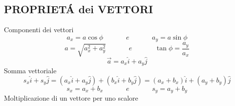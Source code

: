 \documentclass{article}
\newcommand\mathspace{\;\;\;\;\;\;\;\;\;\;\;\; e \;\;\;\;\;\;\;\;\;\;\;\;}
\begin{document}
		\begin{multicols}{2}

		\subsection{PROPRIET\'A dei VETTORI}
			Componenti dei vettori
			\begin{equation} a_x = a \cos \phi \mathspace a_y = a \sin \phi \end{equation}
			\begin{equation} a = \sqrt{a_x^2 + a_y^2} \mathspace \tan \phi = \frac{a_y}{a_x} \end{equation}
			\begin{equation} \vec a = a_x \hat{i} + a_y \hat{j} \end{equation}
			Somma vettoriale
			\[ s_x \hat{i} + s_y \hat{j} = ( a_x \hat{i} + a_y \hat{j} ) + ( b_x \hat{i} + b_y \hat{j} ) = ( a_x + b_x ) \hat{i} + ( a_y + b_y ) \hat{j} \]
			\begin{equation} s_x = a_x + b_x \mathspace s_y = a_y + b_y \end{equation}
			Moltiplicazione di un vettore per uno scalore


\end{multicols}
\end{document}
